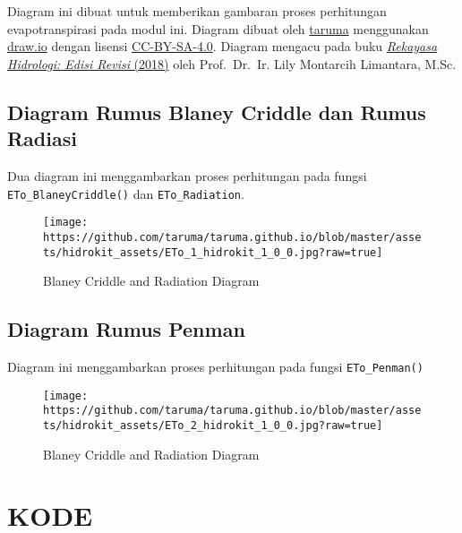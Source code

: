\documentclass[11pt]{article}
\begin{document}
Diagram ini dibuat untuk memberikan gambaran proses perhitungan
evapotranspirasi pada modul ini. Diagram dibuat oleh
\href{https://taruma.github.io}{taruma} menggunakan
\href{https://www.draw.io/}{draw.io} dengan lisensi
\href{https://creativecommons.org/licenses/by-sa/4.0/}{CC-BY-SA-4.0}.
Diagram mengacu pada buku
\href{https://www.gramedia.com/products/rekayasa-hidrologi-edisi-revisi}{\emph{Rekayasa
Hidrologi: Edisi Revisi} (2018)} oleh Prof.~Dr.~Ir. Lily Montarcih
Limantara, M.Sc.

\hypertarget{diagram-rumus-blaney-criddle-dan-rumus-radiasi}{%
\subsection{Diagram Rumus Blaney Criddle dan Rumus
Radiasi}\label{diagram-rumus-blaney-criddle-dan-rumus-radiasi}}

Dua diagram ini menggambarkan proses perhitungan pada fungsi
\texttt{ETo\_BlaneyCriddle()} dan \texttt{ETo\_Radiation}.

\begin{figure}
\centering
\texttt{[image: https://github.com/taruma/taruma.github.io/blob/master/assets/hidrokit\_assets/ETo\_1\_hidrokit\_1\_0\_0.jpg?raw=true]}
\caption{Blaney Criddle and Radiation Diagram}
\end{figure}

\hypertarget{diagram-rumus-penman}{%
\subsection{Diagram Rumus Penman}\label{diagram-rumus-penman}}

Diagram ini menggambarkan proses perhitungan pada fungsi
\texttt{ETo\_Penman()}

\begin{figure}
\centering
\texttt{[image: https://github.com/taruma/taruma.github.io/blob/master/assets/hidrokit\_assets/ETo\_2\_hidrokit\_1\_0\_0.jpg?raw=true]}
\caption{Blaney Criddle and Radiation Diagram}
\end{figure}

    \hypertarget{kode}{%
\section{KODE}\label{kode}}
\end{document}
